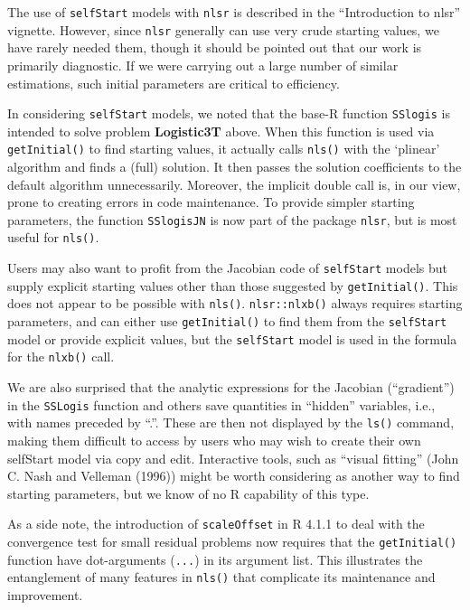 The use of \texttt{selfStart} models with
\texttt{nlsr} is described in the ``Introduction to nlsr'' vignette. However, since \texttt{nlsr}
generally can use very crude starting values, we have rarely needed them, though
it should be pointed out that our work is primarily diagnostic. If we were carrying
out a large number of similar estimations, such initial parameters are
critical to efficiency.

In considering \texttt{selfStart} models, we noted that the base-R function \texttt{SSlogis}
is intended to solve problem \textbf{Logistic3T} above. When this function is used
via \texttt{getInitial()} to find
starting values, it actually calls \texttt{nls()} with the `plinear' algorithm
and finds a (full) solution. It then passes the solution coefficients to the default
algorithm unnecessarily. Moreover, the implicit double call is, in our view, prone to creating
errors in code maintenance.
To provide simpler starting parameters, the function \texttt{SSlogisJN}
is now part of the package \texttt{nlsr}, but is most useful for \texttt{nls()}.

Users may also want to profit from the Jacobian code of \texttt{selfStart} models
but supply explicit starting values other than those suggested by \texttt{getInitial()}.
This does not appear to be possible with \texttt{nls()}. \texttt{nlsr::nlxb()} always requires
starting parameters, and can either use \texttt{getInitial()} to find them from the \texttt{selfStart}
model or provide explicit values, but the \texttt{selfStart} model is used in the formula
for the \texttt{nlxb()} call.

We are also surprised that the
analytic expressions for the Jacobian (``gradient'') in the \texttt{SSLogis} function
and others save quantities in ``hidden''
variables, i.e., with names preceded by ``.''.
These are then not displayed by the \texttt{ls()}
command, making them difficult to access by users who may wish to create
their own selfStart model via copy and edit.
Interactive tools, such as ``visual fitting'' (John C. Nash and Velleman (1996)) might be
worth considering as another way to find starting parameters, but we know of no
R capability of this type.

As a side note, the introduction of \texttt{scaleOffset} in R 4.1.1 to deal with the
convergence test for small residual problems now requires that the \texttt{getInitial()}
function have dot-arguments (\texttt{...}) in its argument list. This illustrates the
entanglement of many features in \texttt{nls()} that complicate its maintenance and
improvement.

